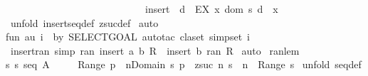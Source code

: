 \begin{isabellebody}
\ \ \ \ \ \ \ \ \ \ \ \ \ \ \ \ \ \ \ \ \ \ \ \ \ \ \ \ {\isacharparenleft}insert\ {}\ {\isacharbraceleft}d\ {\isachardot}\ EX\ x{\isacharcolon}\ dom\ s{\isachardot}\ d\ {\isacharequal}\ {\isacharparenleft}x{\isacharplus}{}{\isacharparenright}{\isacharbraceright}{\isacharparenright}{\isachardoublequoteclose}\isanewline
%
\isadelimproof
%
\endisadelimproof
%
\isatagproof
{}\isamarkupfalse%
\ {\isacharparenleft}unfold\ insertseq{\isacharunderscore}def\ zsuc{\isacharunderscore}def{\isacharparenright}\isanewline
{}\isamarkupfalse%
\ auto\isanewline
{}\isamarkupfalse%
%
\endisatagproof
{\isafoldproof}%
%
\isadelimproof
\isanewline
%
\endisadelimproof
%
\isadelimML
\ \isanewline
%
\endisadelimML
%
\isatagML
{}\isamarkupfalse%
\isanewline
{\isacharverbatimopen}\isanewline
fun\ au\ i\ {\isacharequal}\ by\ {\isacharparenleft}SELECT{\isacharunderscore}GOAL\ {\isacharparenleft}auto{\isacharunderscore}tac\ {\isacharparenleft}claset{\isacharparenleft}{\isacharparenright}{\isacharcomma}\ simpset{\isacharparenleft}{\isacharparenright}{\isacharparenright}\ {\isacharparenright}i{\isacharparenright}\isanewline
{\isacharverbatimclose}%
\endisatagML
{\isafoldML}%
%
\isadelimML
\isanewline
%
\endisadelimML
\isanewline
{}\isamarkupfalse%
\ insert{\isacharunderscore}ran\ {\isacharbrackleft}simp{\isacharbrackright}{\isacharcolon}\ {\isachardoublequoteopen}ran\ {\isacharparenleft}insert\ {\isacharparenleft}a{\isacharcomma}\ b{\isacharparenright}\ R{\isacharparenright}\ {\isacharequal}\ insert\ b\ {\isacharparenleft}ran\ R{\isacharparenright}{\isachardoublequoteclose}\isanewline
%
\isadelimproof
%
\endisadelimproof
%
\isatagproof
{}\isamarkupfalse%
\ auto\isanewline
{}\isamarkupfalse%
%
\endisatagproof
{\isafoldproof}%
%
\isadelimproof
\isanewline
%
\endisadelimproof
\isanewline
\isanewline
{}\isamarkupfalse%
\ ran{\isacharunderscore}lem{\isacharcolon}\ \isanewline
{\isachardoublequoteopen}{\isacharbang}{\isacharbang}s{\isachardot}\ s{\isacharcolon}\ seq\ A\ {\isacharequal}{\isacharequal}{\isachargreater}\ \ \isanewline
\ \ Range\ {\isacharbraceleft}p{\isachardot}\ {\isacharquery}\ n{\isacharcolon}Domain\ s{\isachardot}\ p\ {\isacharequal}\ {\isacharparenleft}zsuc\ n{\isacharcomma}\ s\ {\isacharpercent}{\isacharcircum}\ n{\isacharparenright}{\isacharbraceright}\ {\isacharequal}\ Range\ s{\isachardoublequoteclose}\isanewline
%
\isadelimproof
%
\endisadelimproof
%
\isatagproof
{}\isamarkupfalse%
\ {\isacharparenleft}unfold\ seq{\isacharunderscore}def{\isacharparenright}\isanewline

\end{isabellebody}
